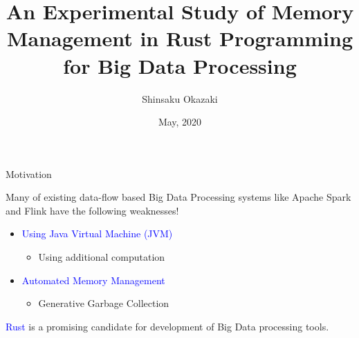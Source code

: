 \documentclass[9pt]{beamer}
\title[]{An Experimental Study of Memory Management in Rust Programming for Big Data Processing}
\date{May, 2020}
\author[Shinsaku Okazaki]{Shinsaku Okazaki}
\institute{Boston University}
\begin{document}
\maketitle








\begin{frame}[fragile]{Motivation}


Many of existing data-flow based Big Data Processing systems like Apache Spark and Flink have the following weaknesses! 
    \vspace{0.5cm}
    \begin{itemize}
        \item \textcolor{blue}{Using Java Virtual Machine (JVM)}
        \begin{itemize}
            \item Using additional computation 
        \end{itemize}
        \item \textcolor{blue}{Automated Memory Management}
        \begin{itemize}
            \item Generative Garbage Collection
        \end{itemize}
    \end{itemize}
    \vspace{0.5cm}
\textcolor{blue}{Rust} is a promising candidate for development of Big Data processing tools.



\end{frame}


\end{document}
